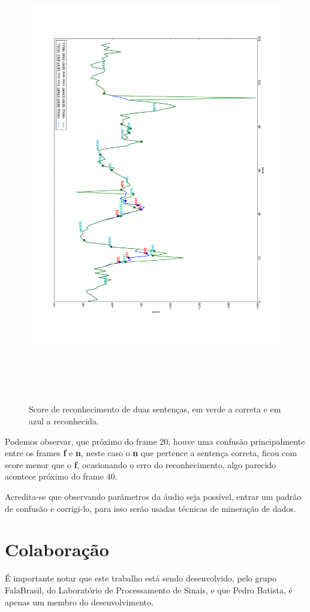 \documentclass[a4paper]{article}
\begin{document}
\begin{figure}[!h]
  \includegraphics[height=20cm]{out}
  \caption{Score de reconhecimento de duas sentenças, em verde a correta e em azul a reconhecida.}
  \label{fig:score}
\end{figure}

Podemos observar, que próximo do frame 20, houve uma confusão principalmente entre os frames
\textbf{f} e \textbf{n}, neste caso o \textbf{n} que pertence a sentença correta,
ficou com score menor que o \textbf{f}, ocasionando o erro do reconhecimento, algo parecido
acontece próximo do frame 40.

Acredita-se que observando parâmetros da áudio seja possível, entrar um padrão de confusão e 
corrigi-lo, para isso serão usadas técnicas de mineração de dados.

\section{Colaboração}

É importante notar que este trabalho está sendo desenvolvido, pelo grupo FalaBrasil, do
Laboratório de Processamento de Sinais, e que Pedro Batista, é apenas um membro do
desenvolvimento.
\end{document}
